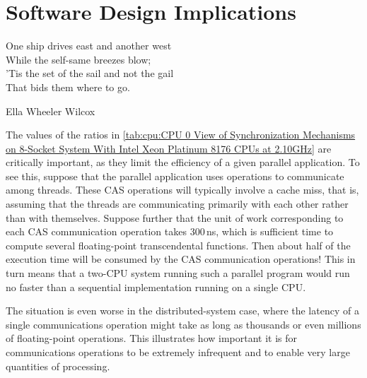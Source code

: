 
\section{Software Design Implications}
\label{sec:cpu:Software Design Implications}
%
\epigraph{One ship drives east and another west \\
	  While the self-same breezes blow; \\
	  'Tis the set of the sail and not the gail \\
	  That bids them where to go.}
	 {Ella Wheeler Wilcox}

The values of the ratios in
\cref{tab:cpu:CPU 0 View of Synchronization Mechanisms on 8-Socket System With Intel Xeon Platinum 8176 CPUs at 2.10GHz}
are critically important, as they limit the
efficiency of a given parallel application.
To see this, suppose that the parallel application uses 
operations to communicate among threads.
These CAS operations will typically involve a cache miss, that is, assuming
that the threads are communicating primarily with each other rather than
with themselves.
Suppose further that the unit of work corresponding to each CAS communication
operation takes 300\,ns, which is sufficient time to compute several
floating-point transcendental functions.
Then about half of the execution time will be consumed by the CAS
communication operations!
This in turn means that a two-CPU system running such a parallel program
would run no faster than a sequential implementation running on a
single CPU\@.

The situation is even worse in the distributed-system case, where the
latency of a single communications operation might take as long as
thousands or even millions of floating-point operations.
This illustrates how important it is for communications operations to
be extremely infrequent and to enable very large quantities of processing.


